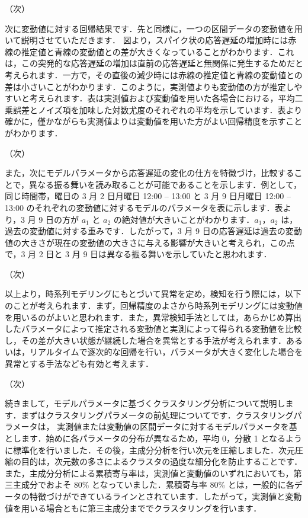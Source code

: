\documentclass[a4j]{jarticle}
\begin{document}
（次）

次に変動値に対する回帰結果です．先と同様に，一つの区間データの変動値を用いて説明させていただきます．
図より，スパイク状の応答遅延の増加時には赤線の推定値と青線の変動値との差が大きくなっていることがわかります．これは，この突発的な応答遅延の増加は直前の応答遅延と無関係に発生するためだと考えられます．一方で，その直後の減少時には赤線の推定値と青線の変動値との差は小さいことがわかります．このように，実測値よりも変動値の方が推定しやすいと考えられます．表は実測値および変動値を用いた各場合における，平均二乗誤差とノイズ項を加味した対数尤度のそれぞれの平均を示しています．表より確かに，僅かながらも実測値よりは変動値を用いた方がよい回帰精度を示すことがわかります．

（次）

また，次にモデルパラメータから応答遅延の変化の仕方を特徴づけ，比較することで，異なる振る舞いを読み取ることが可能であることを示します．例として，同じ時間帯，曜日の 3 月 2 日月曜日 12:00 – 13:00 と 3 月 9 日月曜日 12:00 – 13:00 のそれぞれの変動値に対するモデルのパラメータを表に示します．表より，3 月 9 日の方が $a_1$ と $a_2$ の絶対値が大きいことがわかります．$a_1，a_2$ は，過去の変動値に対する重みです．したがって，3 月 9 日の応答遅延は過去の変動値の大きさが現在の変動値の大きさに与える影響が大きいと考えられ，この点で，3 月 2 日と 3 月 9 日は異なる振る舞いを示していたと思われます．

（次）

以上より，時系列モデリングにもとづいて異常を定め，検知を行う際には，以下のことが考えられます．まず，回帰精度のよさから時系列モデリングには変動値を用いるのがよいと思われます．また，異常検知手法としては，あらかじめ算出したパラメータによって推定される変動値と実測によって得られる変動値を比較し，その差が大きい状態が継続した場合を異常とする手法が考えられます．あるいは，リアルタイムで逐次的な回帰を行い，パラメータが大きく変化した場合を異常とする手法なども有効と考えます．

（次）

続きまして，モデルパラメータに基づくクラスタリング分析について説明します．まずはクラスタリングパラメータの前処理についてです．クラスタリングパラメータは， 実測値または変動値の区間データに対するモデルパラメータを基とします．始めに各パラメータの分布が異なるため，平均 0，分散 1 となるように標準化を行いました．その後，主成分分析を行い次元を圧縮しました．次元圧縮の目的は，次元数の多さによるクラスタの過度な細分化を防止することです．また，主成分分析による累積寄与率は，実測値と変動値のいずれにおいても，第三主成分でおよそ 80\% となっていました．累積寄与率 80\% とは，一般的に各データの特徴づけができているラインとされています．したがって，実測値と変動値を用いる場合ともに第三主成分まででクラスタリングを行います．
\end{document}
